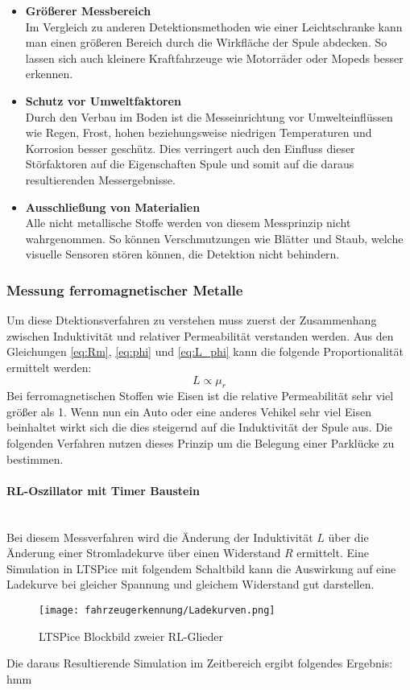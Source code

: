\begin{itemize}
    \item \textbf{Größerer Messbereich} \\
    Im Vergleich zu anderen Detektionsmethoden wie einer Leichtschranke kann man einen größeren Bereich durch die Wirkfläche
    der Spule abdecken. So lassen sich auch kleinere Kraftfahrzeuge wie Motorräder oder Mopeds besser erkennen.
    \item \textbf{Schutz vor Umweltfaktoren} \\
    Durch den Verbau im Boden ist die Messeinrichtung vor Umwelteinflüssen wie Regen, Frost, hohen beziehungsweise
    niedrigen Temperaturen und Korrosion besser geschütz. Dies verringert auch den Einfluss dieser Störfaktoren auf die Eigenschaften
    Spule und somit auf die daraus resultierenden Messergebnisse.
    \item \textbf{Ausschließung von Materialien} \\
    Alle nicht metallische Stoffe werden von diesem Messprinzip nicht wahrgenommen. So können Verschmutzungen wie Blätter und Staub, welche
    visuelle Sensoren stören können, die Detektion nicht behindern.
    
\end{itemize}
\subsubsection{Messung ferromagnetischer Metalle}
Um diese Dtektionsverfahren zu verstehen muss zuerst der Zusammenhang zwischen Induktivität und relativer Permeabilität verstanden werden.
Aus den Gleichungen \ref{eq:Rm}, \ref{eq:phi} und \ref{eq:L_phi} kann die folgende Proportionalität ermittelt werden:
\begin{equation} \label{iq:L_mu}
    L \propto \mu_{r}
\end{equation}
Bei ferromagnetischen Stoffen wie Eisen ist die relative Permeabilität sehr viel größer als 1. Wenn nun ein Auto oder 
eine anderes Vehikel sehr viel Eisen beinhaltet wirkt sich die dies steigernd auf die Induktivität der Spule aus. Die folgenden
Verfahren nutzen dieses Prinzip um die Belegung einer Parklücke zu bestimmen.

\paragraph{RL-Oszillator mit Timer Baustein}\mbox{}\\
Bei diesem Messverfahren wird die Änderung der Induktivität $L$ über die Änderung einer Stromladekurve über einen Widerstand
$R$ ermittelt. Eine Simulation in LTSPice mit folgendem Schaltbild kann die Auswirkung auf eine Ladekurve bei gleicher Spannung
und gleichem Widerstand gut darstellen.
\begin{figure}[H]
    \centering
    \texttt{[image: fahrzeugerkennung/Ladekurven.png]}
    \caption{LTSPice Blockbild zweier RL-Glieder}
\end{figure}
\pagebreak
Die daraus Resultierende Simulation im Zeitbereich ergibt folgendes Ergebnis:
hmm


